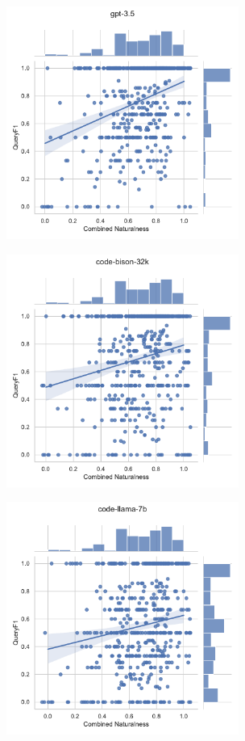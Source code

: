   \begin{figure}
    \centering
    \begin{subfigure}{.5\textwidth}
      \centering
      \includegraphics[height=3in]{figures/distribution-jointplots/jointplot-gpt-3.5-combined-nat-all-schemas-f1-with-distributions.pdf}
    \end{subfigure}%
    \begin{subfigure}{.5\textwidth}
      \centering
      \includegraphics[height=3in]{figures/distribution-jointplots/jointplot-code-bison-32k-combined-nat-all-schemas-f1-with-distributions.pdf}
    \end{subfigure}
    \begin{subfigure}{.5\textwidth}
      \centering
      \includegraphics[height=3in]{figures/distribution-jointplots/jointplot-code-llama-7b-combined-nat-all-schemas-f1-with-distributions.pdf}

\end{subfigure}
\end{figure}
